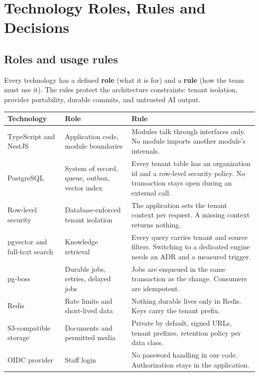 \chapter{Technology Roles, Rules and Decisions}

\section{Roles and usage rules}

Every technology has a defined \textbf{role} (what it is for) and a \textbf{rule} (how the team must use it). The rules protect the architecture constraints: tenant isolation, provider portability, durable commits, and untrusted AI output.

{\small
\begin{longtable}{@{}>{\raggedright\arraybackslash}p{}>{\raggedright\arraybackslash}p{}>{\raggedright\arraybackslash}p{}@{}}
\toprule
\textbf{Technology} & \textbf{Role} & \textbf{Rule} \\
\midrule
\endhead
\bottomrule
\endfoot
TypeScript and NestJS & Application code, module boundaries & Modules talk through interfaces only. No module imports another module's internals. \\
PostgreSQL & System of record, queue, outbox, vector index & Every tenant table has an organization id and a row-level security policy. No transaction stays open during an external call. \\
Row-level security & Database-enforced tenant isolation & The application sets the tenant context per request. A missing context returns nothing. \\
pgvector and full-text search & Knowledge retrieval & Every query carries tenant and source filters. Switching to a dedicated engine needs an ADR and a measured trigger. \\
pg-boss & Durable jobs, retries, delayed jobs & Jobs are enqueued in the same transaction as the change. Consumers are idempotent. \\
Redis & Rate limits and short-lived data & Nothing durable lives only in Redis. Keys carry the tenant prefix. \\
S3-compatible storage & Documents and permitted media & Private by default, signed URLs, tenant prefixes, retention policy per data class. \\
OIDC provider & Staff login & No password handling in our code. Authorization stays in the application. \\

\end{longtable}}
